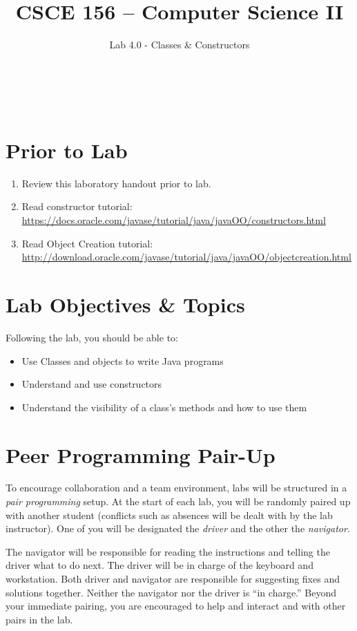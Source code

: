 \documentclass[12pt]{scrartcl}
\title{CSCE 156 -- Computer Science II}
\subtitle{Lab 4.0 - Classes \& Constructors}
\author{~}
\date{~}
\begin{document}
\maketitle

\section*{Prior to Lab}

\begin{enumerate}
  \item Review this laboratory handout prior to lab.
  \item Read constructor tutorial: \\
    \url{https://docs.oracle.com/javase/tutorial/java/javaOO/constructors.html}
  \item Read Object Creation tutorial: \\
	\url{http://download.oracle.com/javase/tutorial/java/javaOO/objectcreation.html}
\end{enumerate}

\section*{Lab Objectives \& Topics}
Following the lab, you should be able to:
\begin{itemize}
  \item Use Classes and objects to write Java programs
  \item Understand and use constructors
  \item Understand the visibility of a class's methods and how to use them
\end{itemize}


\section*{Peer Programming Pair-Up}

To encourage collaboration and a team environment, labs will be
structured in a \emph{pair programming} setup.  At the start of
each lab, you will be randomly paired up with another student 
(conflicts such as absences will be dealt with by the lab instructor).
One of you will be designated the \emph{driver} and the other
the \emph{navigator}.  

The navigator will be responsible for reading the instructions and
telling the driver what to do next.  The driver will be in charge of the
keyboard and workstation.  Both driver and navigator are responsible
for suggesting fixes and solutions together.  Neither the navigator
nor the driver is ``in charge.''  Beyond your immediate pairing, you
are encouraged to help and interact and with other pairs in the lab.
\end{document}
